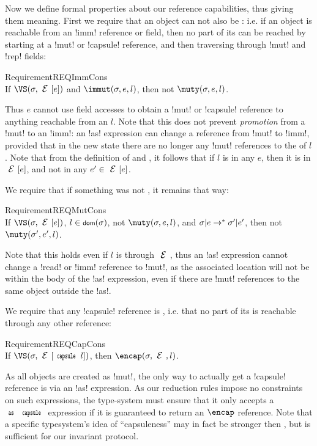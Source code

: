 Now we define formal properties about our reference capabilities, thus giving them meaning. First we require that
an \immut object can not also be \muty: i.e. if an object is reachable from an \Q!imm! reference or field, then no part of its \rog can be reached by starting at a \Q!mut! or \Q!capsule! reference, and then traversing through \Q!mut! and \Q!rep! fields:
\SS\begin{restatable}{Requirement}{REQImmCons}\ \\
	\indent If $\VS(\s, \E[e])$ and $\immut(\s, e, l)$, then not $\muty(\s, e, l)$.
\end{restatable}
\SS\noindent Thus $e$ cannot use field accesses to obtain a \Q!mut! or \Q!capsule! reference to anything reachable from an \immut $l$.
Note that this does not prevent \emph{promotion} from a \Q!mut! to an \Q!imm!: an \Q!as! expression can change a reference from \Q!mut! to \Q!imm!, provided that in the new state there are no longer any \Q!mut! references to the \rog of $l$. Note that from the definition of \muty and \immut, it follows that if $l$ is \immut in any $e$,
then it is \immut in $\E[e]$, and not \muty in any $e' \in \E[e]$.

\LS 

\noindent We require that if something was not \muty, it remains that way:%
\SS\begin{restatable}{Requirement}{REQMutCons}\ \\
	\indent If $\VS(\s, \E[e])$, $l \in \dom(\s)$, not $\muty(\s, e, l)$, and $\sigma|e \rightarrow^{*} \sigma'|e'$, then not $\muty(\s', e', l)$.
\end{restatable}
\SS\noindent Note that this holds even if $l$ is \muty through $\E$, thus an \Q!as! expression cannot change a \Q!read! or \Q!imm! reference to \Q!mut!, as the associated location will not be \muty within the body of the \Q!as! expression, even if there are \Q!mut! references to the same object outside the \Q!as!.

\LS

We require that any \Q!capsule! reference is \encap, i.e. that no \muty part of its \rog is reachable through any other reference:%
\SS\begin{restatable}{Requirement}{REQCapCons}\ \\
\indent If $\VS(\s,\E[\Kw{capsule}\,l])$, then $\encap(\s, \E, l)$.
\end{restatable}%
\SS\noindent As all objects are created as \Q!mut!, the only way to actually get a \Q!capsule! reference is via an \Q!as! expression.
As our reduction rules impose no constraints on such expressions, the type-system must ensure that it only accepts a $\Kw{as}\,\Kw{capsule}$ expression if it is guaranteed to 
return an $\encap$ reference. Note that a specific typesystem's idea of ``capsuleness'' may in fact be stronger then \encap, but \encap is sufficient for our invariant protocol.

